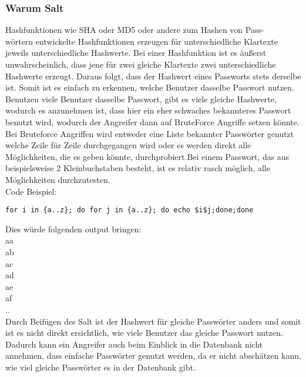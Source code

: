 {\subsubsection{Warum Salt}
Hashfunktionen wie SHA oder MD5 oder andere zum Hashen von Pass-\\wörtern entwickelte Hashfunktionen erzeugen für unterschiedliche Klartexte jeweils unterschiedliche Hashwerte. Bei einer Hashfunktion ist es äußerst unwahrscheinlich, dass jene für zwei gleiche Klartexte zwei unterschiedliche Hashwerte erzeugt. Daraus folgt, dass der Hashwert eines Passworts stets derselbe ist. Somit ist es einfach zu erkennen, welche Benutzer dasselbe Passwort nutzen. Benutzen viele Benutzer dasselbe Passwort, gibt es viele gleiche Hashwerte, wodurch es anzunehmen ist, dass hier ein eher schwaches bekannteres Passwort benutzt wird, wodurch der Angreifer dann auf BruteForce Angriffe setzen könnte. Bei Bruteforce Angriffen wird entweder eine Liste bekannter Passwörter genutzt welche Zeile für Zeile durchgegangen wird oder es werden direkt alle Möglichkeiten, die es geben könnte, durchprobiert.Bei einem Passwort, das aus beispielsweise 2 Kleinbuchstaben besteht, ist es relativ rasch möglich, alle Möglichkeiten durchzutesten.\\ Code Beispiel:
\begin{lstlisting}[caption={Bruteforce example }]
for i in {a..z}; do for j in {a..z}; do echo $i$j;done;done 
\end{lstlisting}
Dies würde folgenden output bringen: \\
aa\\
ab\\
ac\\
ad\\
ae\\
af\\
..\\
Durch Beifügen des Salt ist der Hashwert für gleiche Passwörter anders und somit ist es nicht direkt ersichtlich, wie viele Benutzer das gleiche Passwort nutzen. Dadurch kann ein Angreifer auch beim Einblick in die Datenbank nicht annehmen, dass einfache Passwörter genutzt werden, da er nicht abschätzen kann, wie viel gleiche Passwörter es in der Datenbank gibt.
}

